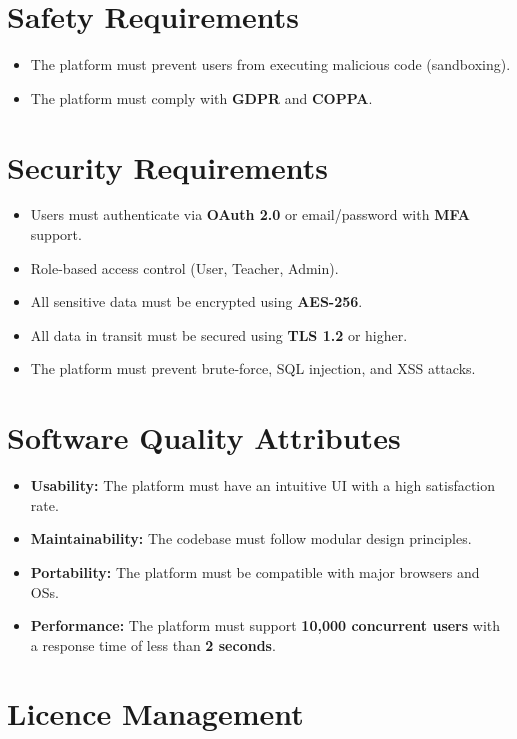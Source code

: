 \documentclass[a4paper, 11pt]{scrreprt}
\begin{document}
\section{Safety Requirements}
\begin{itemize}
    \item The platform must prevent users from executing malicious code (sandboxing).
    \item The platform must comply with \textbf{GDPR} and \textbf{COPPA}.
\end{itemize}

\section{Security Requirements}
\begin{itemize}
    \item Users must authenticate via \textbf{OAuth 2.0} or email/password with \textbf{MFA} support.
    \item Role-based access control (User, Teacher, Admin).
    \item All sensitive data must be encrypted using \textbf{AES-256}.
    \item All data in transit must be secured using \textbf{TLS 1.2} or higher.
    \item The platform must prevent brute-force, SQL injection, and XSS attacks.
\end{itemize}

\section{Software Quality Attributes}
\begin{itemize}
    \item \textbf{Usability:} The platform must have an intuitive UI with a high satisfaction rate.
    \item \textbf{Maintainability:} The codebase must follow modular design principles.
    \item \textbf{Portability:} The platform must be compatible with major browsers and OSs.
    \item \textbf{Performance:} The platform must support \textbf{10,000 concurrent users} with a response time of less than \textbf{2 seconds}.
\end{itemize}



\section{Licence Management}
\end{document}
